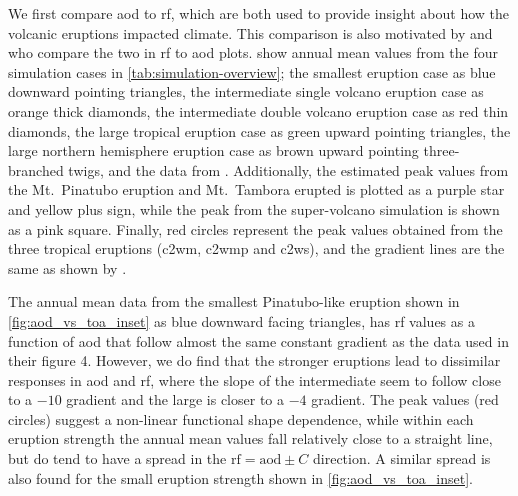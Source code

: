 \documentclass{ametsocV5}
\begin{document}
We first compare \ac{aod} to \ac{rf}, which are both used to provide insight about how
the volcanic eruptions impacted climate. This comparison is also motivated by
\citet[][their figure 4]{gregory2016} and \citet[][their figure 1]{marshall2020} who
compare the two in \ac{rf} to \ac{aod} plots.  show annual
mean values from the four simulation cases in \cref{tab:simulation-overview}; the
smallest eruption case as blue downward pointing triangles, the intermediate single
volcano eruption case as orange thick diamonds, the intermediate double volcano eruption
case as red thin diamonds, the large tropical eruption case as green upward pointing
triangles, the large northern hemisphere eruption case as brown upward pointing
three-branched twigs, and the data from \citet[][figure 4, black crosses from HadCM3
  sstPiHistVol]{gregory2016}. Additionally, the estimated peak values from the Mt.\
Pinatubo eruption and Mt.\ Tambora erupted is plotted as a purple star and yellow plus
sign, while the peak from the \citet{jones2005} super-volcano simulation is shown as a
pink square. Finally, red circles represent the peak values obtained from the three
tropical eruptions (\ac{c2wm}, \ac{c2wmp} and \ac{c2ws}), and the gradient lines are the
same as shown by \citet{gregory2016}.

The annual mean data from the smallest Pinatubo-like eruption shown in
\cref{fig:aod_vs_toa_inset} as blue downward facing triangles, has \ac{rf} values as a
function of \ac{aod} that follow almost the same constant gradient as the
\citet{gregory2016} data used in their figure 4. However, we do find that the stronger
eruptions lead to dissimilar responses in \ac{aod} and \ac{rf}, where the slope of the
intermediate seem to follow close to a \(-10\) gradient and the large is closer to a
\(-4\) gradient. The peak values (red circles) suggest a non-linear functional shape
dependence, while within each eruption strength the annual mean values fall relatively
close to a straight line, but do tend to have a spread in the
\(\mathrm{rf}=\mathrm{aod}\pm C\) direction. A similar spread is also found for the
small eruption strength shown in \cref{fig:aod_vs_toa_inset}.
\end{document}

